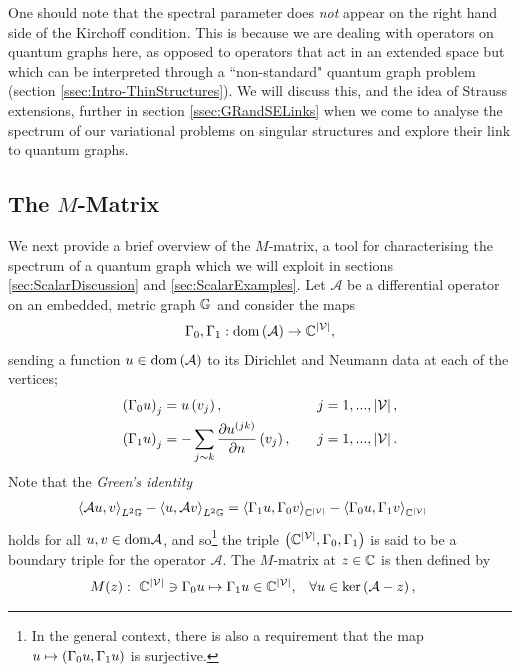 One should note that the spectral parameter does \emph{not} appear on the right hand side of the Kirchoff condition.
This is because we are dealing with operators on quantum graphs here, as opposed to operators that act in an extended space but which can be interpreted through a ``non-standard" quantum graph problem (section \ref{ssec:Intro-ThinStructures}).
We will discuss this, and the idea of Strauss extensions, further in section \ref{ssec:GRandSELinks} when we come to analyse the spectrum of our variational problems on singular structures and explore their link to quantum graphs.

\subsection{The $M$-Matrix} \label{ssec:MMatrix}
We next provide a brief overview of the $M$-matrix, a tool for characterising the spectrum of a quantum graph which we will exploit in sections \ref{sec:ScalarDiscussion} and \ref{sec:ScalarExamples}.
Let $\mathcal{A}$ be a differential operator on an embedded, metric graph $\mathbb{G}$ and consider the maps
\begin{align*}
	\Gamma_0, \Gamma_1: \mathrm{dom}\left( \mathcal{A} \right) \rightarrow \mathbb{C}^{\left\lvert \mathcal{V} \right\rvert},
\end{align*}
sending a function $u\in\mathrm{dom}\left( \mathcal{A} \right)$ to its Dirichlet and Neumann data at each of the vertices;
\begin{align*}
	\left( \Gamma_0 u \right)_j &= u\left( v_j \right), \quad &j=1,...,\left\lvert \mathcal{V} \right\rvert, \\
	\left( \Gamma_1 u \right)_j &= -\sum_{j\sim k}\dfrac{\partial u^{(jk)}}{\partial n}\left( v_j \right), \quad &j=1,...,\left\lvert \mathcal{V} \right\rvert. 
\end{align*}
Note that the \emph{Green's identity}
\begin{align*}
	\left\langle \mathcal{A}u , v \right\rangle_{L^2{\mathbb{G}}} - \left\langle u , \mathcal{A}v \right\rangle_{L^2{\mathbb{G}}}
	&= \left\langle \Gamma_1 u , \Gamma_0 v \right\rangle_{\mathbb{C}^{\left\lvert \mathcal{V} \right\rvert}} - \left\langle \Gamma_0 u , \Gamma_1 v \right\rangle_{\mathbb{C}^{\left\lvert \mathcal{V} \right\rvert}}
\end{align*}
holds for all $u,v\in\mathrm{dom}\mathcal{A}$, and so\footnote{In the general context, there is also a requirement that the map $u\mapsto\left( \Gamma_0 u, \Gamma_1 u \right)$ is surjective.} the triple $\left( \mathbb{C}^{\left\lvert \mathcal{V} \right\rvert},\Gamma_0,\Gamma_1 \right)$ is said to be a boundary triple for the operator $\mathcal{A}$.
The $M$-matrix at $z\in\mathbb{C}$ is then defined by
\begin{align*}
	M(z): \ \mathbb{C}^{\left\lvert \mathcal{V} \right\rvert} \ni \Gamma_0 u \mapsto \Gamma_1 u \in \mathbb{C}^{\left\lvert \mathcal{V} \right\rvert},
	 &\quad \forall u\in\mathrm{ker}\left( \mathcal{A}-z \right),
\end{align*}
